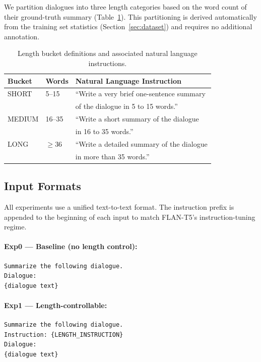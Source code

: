 \documentclass[11pt,a4paper]{article}
\begin{document}
We partition dialogues into three length categories based on the word count of their ground-truth summary (Table~\ref{tab:buckets}).
This partitioning is derived automatically from the training set statistics (Section~\ref{sec:dataset}) and requires no additional annotation.

\begin{table}[t]
\centering
\caption{Length bucket definitions and associated natural language instructions.}
\label{tab:buckets}
\small
\begin{tabular}{@{}lll@{}}
\toprule
\textbf{Bucket} & \textbf{Words} & \textbf{Natural Language Instruction} \\
\midrule
SHORT  & 5--15  & ``Write a very brief one-sentence summary \\
       &        & \quad of the dialogue in 5 to 15 words.'' \\
MEDIUM & 16--35 & ``Write a short summary of the dialogue \\
       &        & \quad in 16 to 35 words.'' \\
LONG   & $\geq$36 & ``Write a detailed summary of the dialogue \\
       &        & \quad in more than 35 words.'' \\
\bottomrule
\end{tabular}
\end{table}

\subsection{Input Formats}

All experiments use a unified text-to-text format.
The instruction prefix is appended to the beginning of each input to match FLAN-T5's instruction-tuning regime.

\paragraph{Exp0 --- Baseline (no length control):}
\begin{lstlisting}
Summarize the following dialogue.
Dialogue:
{dialogue text}
\end{lstlisting}

\paragraph{Exp1 --- Length-controllable:}
\begin{lstlisting}
Summarize the following dialogue.
Instruction: {LENGTH_INSTRUCTION}
Dialogue:
{dialogue text}
\end{lstlisting}
\end{document}
